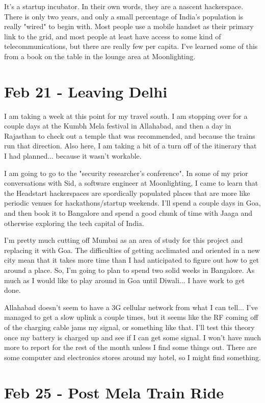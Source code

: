 \documentclass[11pt]{amsart}
\begin{document}
It's a startup incubator. In their own words, they are a nascent hackerspace. There is only two years, and only a small percentage of India's population is really "wired" to begin with. Most people use a mobile handset as their primary link to the grid, and most people at least have access to some kind of telecommunications, but there are really few per capita. I've learned some of this from a book on the table in the lounge area at Moonlighting.

\section{Feb 21 - Leaving Delhi}

I am taking a week at this point for my travel south. I am stopping over for a couple days at the Kumbh Mela festival in Allahabad, and then a day in Rajasthan to check out a temple that was recommended, and because the trains run that direction. Also here, I am taking a bit of a turn off of the itinerary that I had planned... because it wasn't workable.

I am going to go to the "security researcher's conference". In some of my prior conversations with Sid, a software engineer at Moonlighting, I came to learn that the Headstart hackerspaces are spordically populated places that are more like periodic venues for hackathons/startup weekends. I'll spend a couple days in Goa, and then book it to Bangalore and spend a good chunk of time with Jaaga and otherwise exploring the tech capital of India.

I'm pretty much cutting off Mumbai as an area of study for this project and replacing it with Goa. The difficulties of getting acclimated and oriented in a new city mean that it takes more time than I had anticipated to figure out how to get around a place. So, I'm going to plan to spend two solid weeks in Bangalore. As much as I would like to play around in Goa until Diwali...  I have work to get done.

Allahabad doesn't seem to have a 3G cellular network from what I can tell...  I've managed to get a slow uplink a couple times, but it seems like the RF coming off of the charging cable jams my signal, or something like that. I'll test this theory once my battery is charged up and see if I can get some signal. I won't have much more to report for the rest of the month unless I find some things out. There are some computer and electronics stores around my hotel, so I might find something.

\section{Feb 25 - Post Mela Train Ride}
\end{document}
